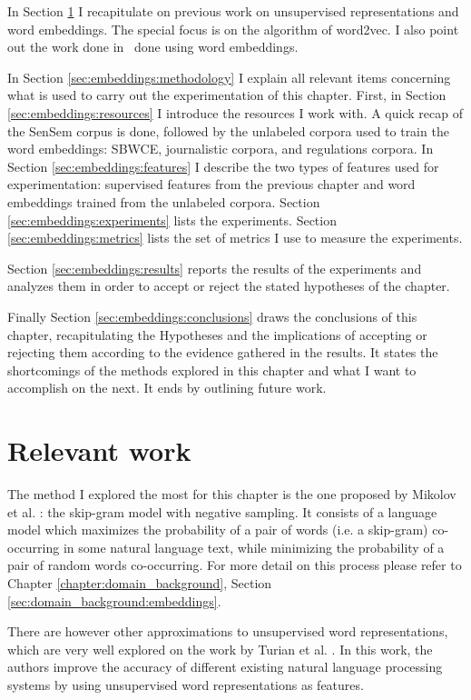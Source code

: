 In Section \ref{sec:embeddings:previous} I recapitulate on previous work
on unsupervised representations and word embeddings. The special
focus is on the algorithm of word2vec. I also point out the work
done in \wsd~done using word embeddings.

In Section \ref{sec:embeddings:methodology} I explain all relevant items
concerning what is used to carry out the experimentation of this chapter.
First, in Section \ref{sec:embeddings:resources} I introduce the resources
I work with. A quick recap of the SenSem corpus is done, followed by the
unlabeled corpora used to train the word embeddings: SBWCE, journalistic
corpora, and regulations corpora. In Section \ref{sec:embeddings:features} I
describe the two types of features used for experimentation: supervised
features from the previous chapter and word embeddings trained from the
unlabeled corpora. Section \ref{sec:embeddings:experiments} lists the
experiments. Section \ref{sec:embeddings:metrics} lists the set of metrics
I use to measure the experiments.

Section \ref{sec:embeddings:results} reports the results of the experiments and
analyzes them in order to accept or reject the stated hypotheses of the
chapter.

Finally Section \ref{sec:embeddings:conclusions} draws the conclusions of this
chapter, recapitulating the Hypotheses and the implications of accepting or
rejecting them according to the evidence gathered in the results. It states the
shortcomings of the methods explored in this chapter and what I want to
accomplish on the next. It ends by outlining future work.

\section{Relevant work}\label{sec:embeddings:previous}

The method I explored the most for this chapter is the one proposed by Mikolov
et al. \cite{Mikolov2013a}: the skip-gram model with negative sampling. It
consists of a language model which maximizes the probability of a pair of words
(i.e. a skip-gram) co-occurring in some natural language text, while minimizing
the probability of a pair of random words co-occurring. For more detail on this
process please refer to Chapter \ref{chapter:domain_background}, Section
\ref{sec:domain_background:embeddings}.

There are however other approximations to unsupervised word representations,
which are very well explored on the work by Turian et al.
\cite{Turian:2010:WRS:1858681.1858721}. In this work, the authors improve the
accuracy of different existing natural language processing systems by using
unsupervised word representations as features.

